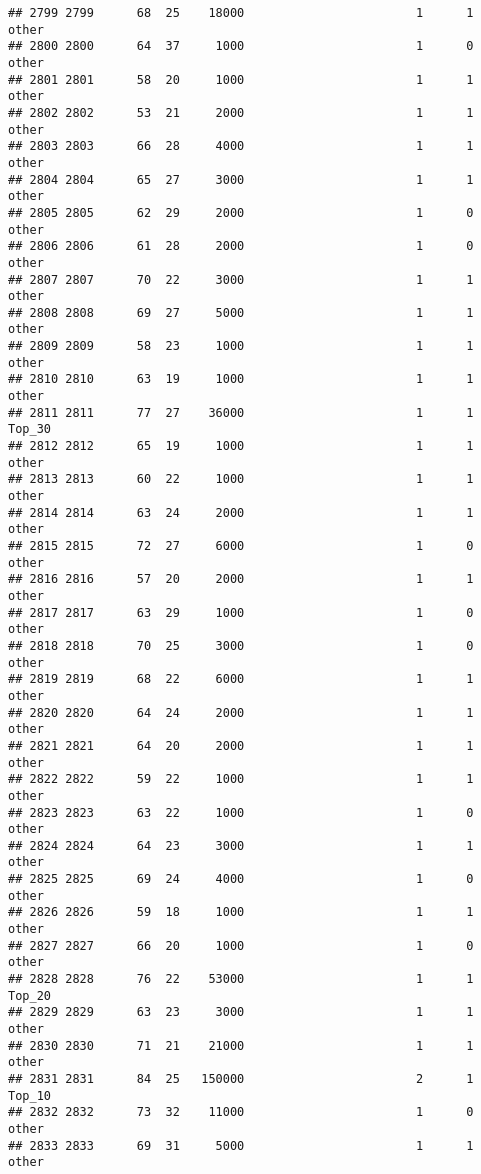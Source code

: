\documentclass[
]{article}
\begin{document}
\begin{verbatim}
## 2799 2799      68  25    18000                        1      1    other
## 2800 2800      64  37     1000                        1      0    other
## 2801 2801      58  20     1000                        1      1    other
## 2802 2802      53  21     2000                        1      1    other
## 2803 2803      66  28     4000                        1      1    other
## 2804 2804      65  27     3000                        1      1    other
## 2805 2805      62  29     2000                        1      0    other
## 2806 2806      61  28     2000                        1      0    other
## 2807 2807      70  22     3000                        1      1    other
## 2808 2808      69  27     5000                        1      1    other
## 2809 2809      58  23     1000                        1      1    other
## 2810 2810      63  19     1000                        1      1    other
## 2811 2811      77  27    36000                        1      1   Top_30
## 2812 2812      65  19     1000                        1      1    other
## 2813 2813      60  22     1000                        1      1    other
## 2814 2814      63  24     2000                        1      1    other
## 2815 2815      72  27     6000                        1      0    other
## 2816 2816      57  20     2000                        1      1    other
## 2817 2817      63  29     1000                        1      0    other
## 2818 2818      70  25     3000                        1      0    other
## 2819 2819      68  22     6000                        1      1    other
## 2820 2820      64  24     2000                        1      1    other
## 2821 2821      64  20     2000                        1      1    other
## 2822 2822      59  22     1000                        1      1    other
## 2823 2823      63  22     1000                        1      0    other
## 2824 2824      64  23     3000                        1      1    other
## 2825 2825      69  24     4000                        1      0    other
## 2826 2826      59  18     1000                        1      1    other
## 2827 2827      66  20     1000                        1      0    other
## 2828 2828      76  22    53000                        1      1   Top_20
## 2829 2829      63  23     3000                        1      1    other
## 2830 2830      71  21    21000                        1      1    other
## 2831 2831      84  25   150000                        2      1   Top_10
## 2832 2832      73  32    11000                        1      0    other
## 2833 2833      69  31     5000                        1      1    other

\end{verbatim}
\end{document}
